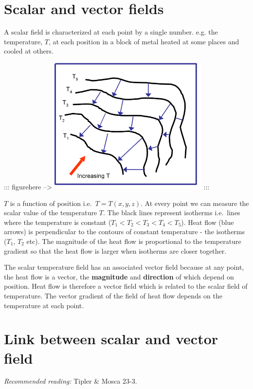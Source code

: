 \documentclass[
  letterpaper,
  DIV=11,
  numbers=noendperiod]{scrreprt}
\begin{document}
\section{Scalar and vector fields}\label{scalar-and-vector-fields}

A scalar field is characterized at each point by a single number. e.g.
the temperature, \(T\), at each position in a block of metal heated at
some places and cooled at others.

::: figurehere --\textgreater{}
\includegraphics[width=80mm,height=\textheight]{Figures/isotherms.png}
:::

\(T\) is a function of position i.e.~\(T = T(x,y,z)\). At every point we
can measure the scalar value of the temperature \(T\). The black lines
represent isotherms i.e.~lines where the temperature is constant
(\(T_1 < T_2 < T_3 < T_4 < T_5\)). Heat flow (blue arrows) is
perpendicular to the contours of constant temperature - the isotherms
(\(T_1\), \(T_2\) etc). The magnitude of the heat flow is proportional
to the temperature gradient so that the heat flow is larger when
isotherms are closer together.

The scalar temperature field has an associated vector field because at
any point, the heat flow is a vector, the \textbf{magnitude} and
\textbf{direction} of which depend on position. Heat flow is therefore a
vector field which is related to the scalar field of temperature. The
vector gradient of the field of heat flow depends on the temperature at
each point.

\section{Link between scalar and vector
field}\label{link-between-scalar-and-vector-field}

\emph{Recommended reading:} Tipler \& Mosca 23-3.
\end{document}
